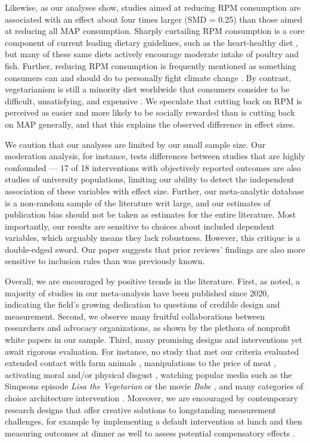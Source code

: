 \documentclass[sn-nature,referee,pdflatex]{sn-jnl}
\begin{document}
Likewise, as our analyses show, studies aimed at reducing RPM
consumption are associated with an effect about four times larger (SMD =
0.25) than those aimed at reducing all MAP consumption. Sharply
curtailing RPM consumption is a core component of current leading
dietary guidelines, such as the heart-healthy diet \citep{diab2023}, but
many of these same diets actively encourage moderate intake of poultry
and fish. Further, reducing RPM consumption is frequently mentioned as
something consumers can and should do to personally fight climate change
\citep{auclair2024}. By contrast, vegetarianism is still a minority diet
worldwide \citep{tilman2014} that consumers consider to be difficult,
unsatisfying, and expensive \citep{bryant2019}. We speculate that
cutting back on RPM is perceived as easier and more likely to be
socially rewarded than is cutting back on MAP generally, and that this
explains the observed difference in effect sizes.

We caution that our analyses are limited by our small sample size. Our
moderation analysis, for instance, tests differences between studies
that are highly confounded --- 17 of 18 interventions with objectively
reported outcomes are also studies of university populations, limiting
our ability to detect the independent association of these variables
with effect size. Further, our meta-analytic database is a non-random
sample of the literature writ large, and our estimates of publication
bias should not be taken as estimates for the entire literature. Most
importantly, our results are sensitive to choices about included
dependent variables, which arguably means they lack robustness. However,
this critique is a double-edged sword. Our paper suggests that prior
reviews' findings are also more sensitive to inclusion rules than was
previously known.

Overall, we are encouraged by positive trends in the literature. First,
as noted, a majority of studies in our meta-analysis have been published
since 2020, indicating the field's growing dedication to questions of
credible design and measurement. Second, we observe many fruitful
collaborations between researchers and advocacy organizations, as shown
by the plethora of nonprofit white papers in our sample. Third, many
promising designs and interventions yet await rigorous evaluation. For
instance, no study that met our criteria evaluated extended contact with
farm animals \citep{cerrato2022}, manipulations to the price of meat
\citep{wilde2016}, activating moral and/or physical disgust
\citep{palomo2018}, watching popular media such as the Simpsons episode
\emph{Lisa the Vegetarian} \citep{byrd2010} or the movie \emph{Babe
\citep{novatna2019}} , and many categories of choice architecture
intervention \citep{olafsson2024}. Moreover, we are encouraged by
contemporary research designs that offer creative solutions to
longstanding measurement challenges, for example by implementing a
default intervention at lunch and then measuring outcomes at dinner as
well to assess potential compensatory effects \citep{vocski2024}.
\end{document}
